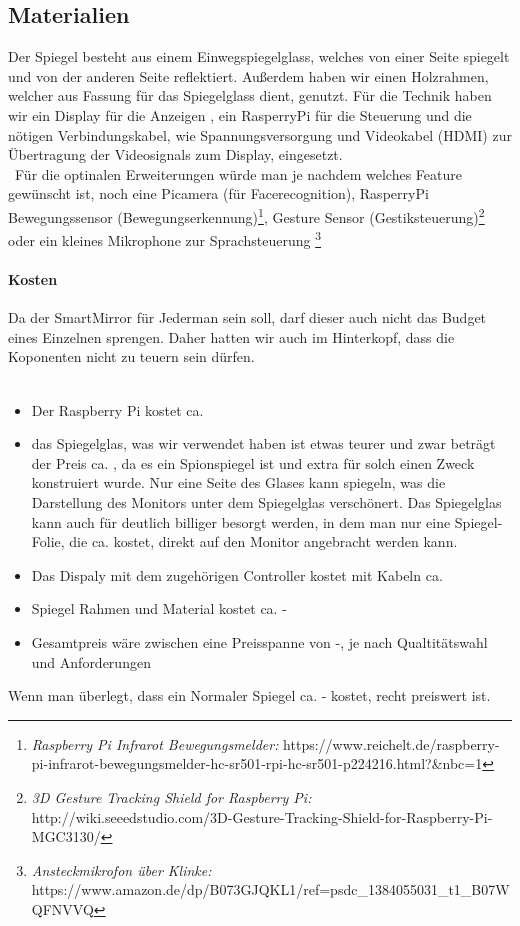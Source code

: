 \subsection{Materialien}
Der Spiegel besteht aus einem Einwegspiegelglass, welches von einer Seite spiegelt und von der anderen Seite reflektiert. Außerdem haben wir einen Holzrahmen, welcher aus Fassung für das Spiegelglass dient, genutzt. Für die Technik haben wir ein Display für die Anzeigen , ein RasperryPi für die Steuerung und die nötigen Verbindungskabel, wie Spannungsversorgung und Videokabel (HDMI) zur Übertragung der Videosignals zum Display, eingesetzt.\\\
Für die optinalen Erweiterungen würde man je nachdem welches Feature gewünscht ist, noch eine Picamera (für Facerecognition), RasperryPi Bewegungssensor (Bewegungserkennung)\footnote{\textit{ Raspberry Pi Infrarot Bewegungsmelder:} https://www.reichelt.de/raspberry-pi-infrarot-bewegungsmelder-hc-sr501-rpi-hc-sr501-p224216.html?\&nbc=1}, Gesture Sensor (Gestiksteuerung)\footnote{\textit{3D Gesture Tracking Shield for Raspberry Pi:}  http://wiki.seeedstudio.com/3D-Gesture-Tracking-Shield-for-Raspberry-Pi-MGC3130/} oder ein kleines Mikrophone zur Sprachsteuerung \footnote{\textit{Ansteckmikrofon über Klinke:} https://www.amazon.de/dp/B073GJQKL1/ref=psdc\_1384055031\_t1\_B07WQFNVVQ}

\paragraph{Kosten}
Da der SmartMirror für Jederman sein soll, darf dieser auch nicht das Budget eines Einzelnen sprengen. Daher hatten wir auch im Hinterkopf, dass die Koponenten nicht zu teuern sein dürfen.\\\
\begin{itemize}
\item Der Raspberry Pi kostet ca. \EUR{40} 
\item das Spiegelglas, was wir verwendet haben ist etwas teurer und zwar beträgt der Preis ca. , da es ein Spionspiegel ist und extra für solch einen Zweck konstruiert wurde. Nur eine Seite des Glases kann spiegeln, was die Darstellung des Monitors unter dem Spiegelglas verschönert. Das Spiegelglas kann auch für deutlich billiger besorgt werden, in dem man nur eine Spiegel-Folie, die ca.  kostet, direkt auf den Monitor angebracht werden kann.
\item Das Dispaly mit dem zugehörigen Controller kostet mit Kabeln ca. 
\item Spiegel Rahmen und Material kostet ca. \EUR{10}-\EUR{20}
\item Gesamtpreis wäre zwischen eine Preisspanne von \EUR{120}-\EUR{190}, je nach Qualtitätswahl und Anforderungen
\end{itemize}
Wenn man überlegt, dass ein Normaler Spiegel ca. \EUR{80}-\EUR{100} kostet, recht preiswert ist.